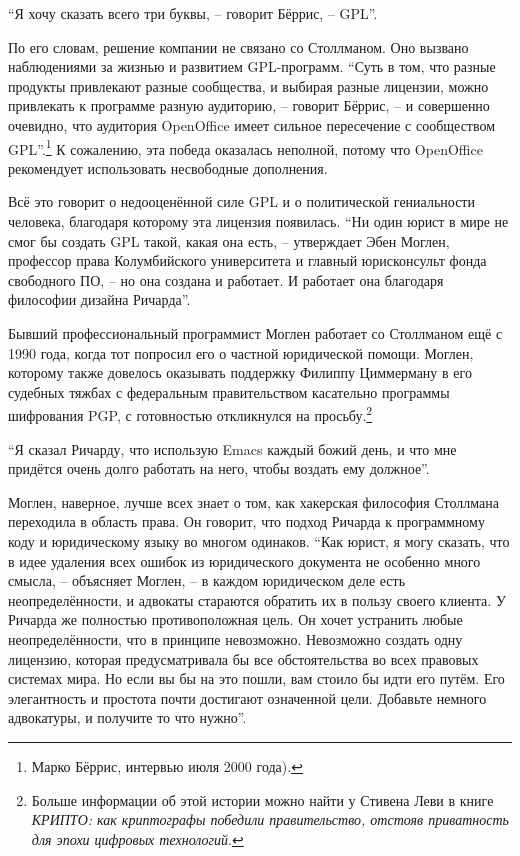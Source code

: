 \enquote{Я хочу сказать всего три буквы, -- говорит Бёррис, -- GPL}.

По его словам, решение компании не связано со Столлманом. Оно вызвано наблюдениями за жизнью и развитием GPL-программ. \enquote{Суть в том, что разные продукты привлекают разные сообщества, и выбирая разные лицензии, можно привлекать к программе разную аудиторию, -- говорит Бёррис, -- и совершенно очевидно, что аудитория OpenOffice имеет сильное пересечение с сообществом GPL}.\footnote{Марко Бёррис, интервью июля 2000 года).} К сожалению, эта победа оказалась неполной, потому что OpenOffice рекомендует использовать несвободные дополнения.

Всё это говорит о недооценённой силе GPL и о политической гениальности человека, благодаря которому эта лицензия появилась. \enquote{Ни один юрист в мире не смог бы создать GPL такой, какая она есть, -- утверждает Эбен Моглен, профессор права Колумбийского университета и главный юрисконсульт фонда свободного ПО, -- но она создана и работает. И работает она благодаря философии дизайна Ричарда}.

Бывший профессиональный программист Моглен работает со Столлманом ещё с 1990 года, когда тот попросил его о частной юридической помощи. Моглен, которому также довелось оказывать поддержку Филиппу Циммерману в его судебных тяжбах с федеральным правительством касательно программы шифрования PGP, с готовностью откликнулся на просьбу.\footnote{Больше информации об этой истории можно найти у Стивена Леви в книге \textit{КРИПТО: как криптографы победили правительство, отстояв приватность для эпохи цифровых технологий}.}

\enquote{Я сказал Ричарду, что использую Emacs каждый божий день, и что мне придётся очень долго работать на него, чтобы воздать ему должное}.

Моглен, наверное, лучше всех знает о том, как хакерская философия Столлмана переходила в область права. Он говорит, что подход Ричарда к программному коду и юридическому языку во многом одинаков. \enquote{Как юрист, я могу сказать, что в идее удаления всех ошибок из юридического документа не особенно много смысла, -- объясняет Моглен, -- в каждом юридическом деле есть неопределённости, и адвокаты стараются обратить их в пользу своего клиента. У Ричарда же полностью противоположная цель. Он хочет устранить любые неопределённости, что в принципе невозможно. Невозможно создать одну лицензию, которая предусматривала бы все обстоятельства во всех правовых системах мира. Но если вы бы на это пошли, вам стоило бы идти его путём. Его элегантность и простота почти достигают означенной цели. Добавьте немного адвокатуры, и получите то что нужно}.

